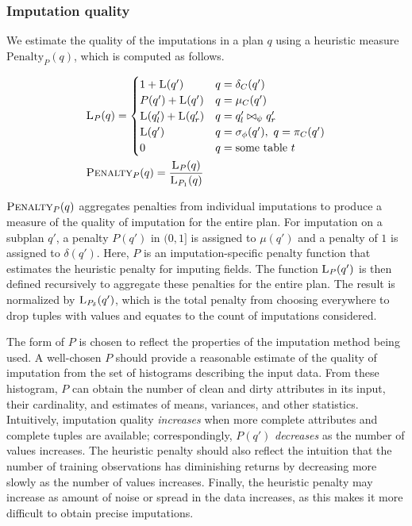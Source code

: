 \begin{algorithm}

\end{algorithm}

\subsubsection{Imputation quality}
\label{sec:quality}
We estimate the quality of the imputations in a plan $q$ using a heuristic measure $\text{Penalty}_{P}(q)$, which is computed as follows.

\begin{align*}
    &\textsc{L}_{P}(q) = \begin{cases}
     1 + \textsc{L}(q') & q = \delta_C(q') \\
     P(q') + \textsc{L}(q') & q = \mu_C(q') \\
     \textsc{L}(q_l') + \textsc{L}(q_r') & q = q_l' \bowtie_\psi q_r' \\
     \textsc{L}(q') & q = \sigma_\phi(q'),\ q = \pi_C(q') \\
     0 & q = \text{some table } t\\
  \end{cases}\\
    &\textsc{Penalty}_{P}(q) = \frac{\textsc{L}_{P}(q)}{\textsc{L}_{P_1}(q)}
\end{align*}

$\textsc{Penalty}_{P}(q)$ aggregates penalties from individual imputations to produce a measure of the quality of imputation for the entire plan.
For imputation on a subplan $q'$, a penalty $P(q')$ in $(0,1]$ is assigned to $\mu(q')$
and a penalty of $1$ is assigned to $\delta(q')$. Here, $P$ is an imputation-specific penalty function that estimates the heuristic penalty for imputing \nullv{} fields.
The function $\textsc{L}_{P}(q')$ is then defined recursively to aggregate these penalties for the entire plan. The result is normalized by $\textsc{L}_{P_\delta}(q')$, which is the total penalty from choosing everywhere to drop tuples with \nullv{} values and equates to the count of imputations considered.

The form of $P$ is chosen to reflect the properties of the imputation method being used.
A well-chosen $P$ should provide a reasonable estimate of the quality of imputation from the set of histograms describing the input data.
From these histogram, $P$ can obtain the number of clean and dirty attributes in its input, their cardinality, and estimates of means, variances, and other statistics.
Intuitively, imputation quality \textit{increases} when more complete attributes and complete tuples are available; correspondingly, $P(q')$ \textit{decreases} as the number of values increases.
The heuristic penalty should also reflect the intuition that the number of training observations has diminishing returns by decreasing more slowly as the number of values increases. Finally, the heuristic penalty may increase as amount of noise or spread in the data increases, as this makes it more difficult to obtain precise imputations.

